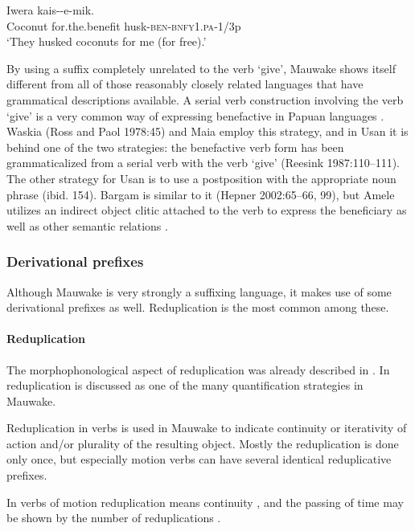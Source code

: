 \ea%
\label{ex:3:x215}
\gll Iwera  kais--e-mik. \\
Coconut for.the.benefit husk-\textsc{ben}-\textsc{bnfy}1.\textsc{pa}-1/3p \\
\glt`They husked coconuts for me (for free).'
\z

By using a suffix completely unrelated to the verb `give', Mauwake shows itself different from all of those reasonably closely related languages that have grammatical descriptions available. A serial verb construction involving the verb `give' is a very common way of expressing benefactive in Papuan languages \citep[141]{Foley1986}. Waskia ({Ross and Paol 1978}:45) and Maia \citep[125]{Hardin2002} employ this strategy, and in Usan it is behind one of the two strategies: the benefactive verb form has been grammaticalized from a serial verb with the verb `give' ({Reesink 1987}:110--111). The other strategy for Usan is to use a postposition with the appropriate noun phrase (ibid. 154). Bargam is similar to it ({Hepner 2002}:65--66, 99), but Amele utilizes an indirect object clitic attached to the verb to express the beneficiary as well as other semantic relations \citep[167]{Roberts1987}. 

\subsubsection{Derivational prefixes}\label{sec:3:z:y:x}
{}
Although Mauwake is very strongly a suffixing language, it makes use of some derivational prefixes as well. Reduplication is the most common among these. 

\paragraph{Reduplication}\label{sec:3.8.2.4.1}
{}
The morphophonological aspect of reduplication was already described in . In  reduplication is discussed as one of the many quantification strategies in Mauwake.

Reduplication in verbs is used in Mauwake to indicate continuity or iterativity of action and/or plurality of the resulting object. Mostly the reduplication is done only once, but especially motion verbs can have several identical reduplicative prefixes. 

In verbs of motion reduplication means continuity , and the passing of time may be shown by the number of reduplications .

